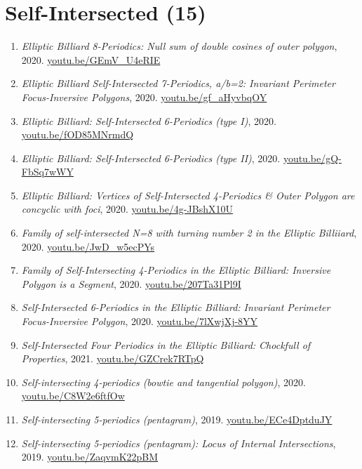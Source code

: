 \documentclass[12pt]{article}
\begin{document}
\section{Self-Intersected (15)}

\begin{enumerate}[resume]
\item \textit{Elliptic Billiard 8-Periodics: Null sum of double cosines of outer polygon}, 2020. \href{https://youtu.be/GEmV_U4eRIE}{\url{youtu.be/GEmV\_U4eRIE}}
\item \textit{Elliptic Billiard Self-Intersected 7-Periodics, a/b=2: Invariant Perimeter Focus-Inversive Polygons}, 2020. \href{https://youtu.be/gf_aHyvbqOY}{\url{youtu.be/gf\_aHyvbqOY}}
\item \textit{Elliptic Billiard: Self-Intersected 6-Periodics (type I)}, 2020. \href{https://youtu.be/fOD85MNrmdQ}{\url{youtu.be/fOD85MNrmdQ}}
\item \textit{Elliptic Billiard: Self-Intersected 6-Periodics (type II)}, 2020. \href{https://youtu.be/gQ-FbSq7wWY}{\url{youtu.be/gQ-FbSq7wWY}}
\item \textit{Elliptic Billiard: Vertices of Self-Intersected 4-Periodics \& Outer Polygon are concyclic with foci}, 2020. \href{https://youtu.be/4g-JBshX10U}{\url{youtu.be/4g-JBshX10U}}
\item \textit{Family of self-intersected N=8 with turning number 2 in the Elliptic Billiiard}, 2020. \href{https://youtu.be/JwD_w5ecPYs}{\url{youtu.be/JwD\_w5ecPYs}}
\item \textit{Family of Self-Intersecting 4-Periodics in the Elliptic Billiard: Inversive Polygon is a Segment}, 2020. \href{https://youtu.be/207Ta31Pl9I}{\url{youtu.be/207Ta31Pl9I}}
\item \textit{Self-Intersected 6-Periodics in the Elliptic Billiard: Invariant Perimeter Focus-Inversive Polygon}, 2020. \href{https://youtu.be/7lXwjXj-8YY}{\url{youtu.be/7lXwjXj-8YY}}
\item \textit{Self-Intersected Four Periodics in the Elliptic Billiard: Chockfull of Properties}, 2021. \href{https://youtu.be/GZCrek7RTpQ}{\url{youtu.be/GZCrek7RTpQ}}
\item \textit{Self-intersecting 4-periodics (bowtie and tangential polygon)}, 2020. \href{https://youtu.be/C8W2e6ftfOw}{\url{youtu.be/C8W2e6ftfOw}}
\item \textit{Self-intersecting 5-periodics (pentagram)}, 2019. \href{https://youtu.be/ECe4DptduJY}{\url{youtu.be/ECe4DptduJY}}
\item \textit{Self-intersecting 5-periodics (pentagram): Locus of Internal Intersections}, 2019. \href{https://youtu.be/ZaqvmK22pBM}{\url{youtu.be/ZaqvmK22pBM}}

\end{enumerate}
\end{document}
